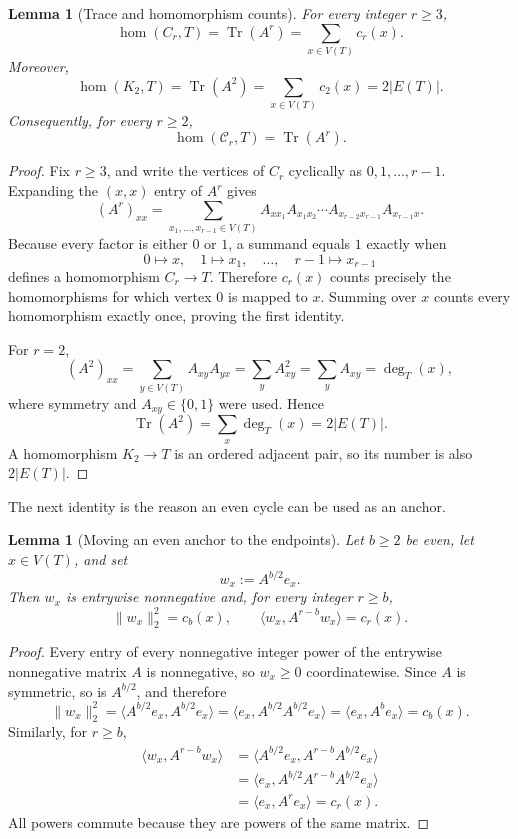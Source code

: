 \documentclass[11pt]{article}
\newtheorem{lemma}[theorem]{Lemma}
\newcommand{\homn}{\operatorname{hom}}
\newcommand{\tr}{\operatorname{Tr}}
\newcommand{\1}{\mathbf{1}}
\newcommand{\Ct}{\mathcal{C}}
\begin{document}
\begin{lemma}[Trace and homomorphism counts]\label{lem:trace-hom}
For every integer $r\ge3$,
\[
  \homn(C_r,T)=\tr(A^r)=\sum_{x\in V(T)}c_r(x).
\]
Moreover,
\[
  \homn(K_2,T)=\tr(A^2)=\sum_{x\in V(T)}c_2(x)=2|E(T)|.
\]
Consequently, for every $r\ge2$,
\[
  \homn(\Ct_r,T)=\tr(A^r).
\]
\end{lemma}

\begin{proof}
Fix $r\ge3$, and write the vertices of $C_r$ cyclically as
$0,1,\ldots,r-1$.  Expanding the $(x,x)$ entry of $A^r$ gives
\[
  (A^r)_{xx}
  =
  \sum_{x_1,\ldots,x_{r-1}\in V(T)}
  A_{x x_1}A_{x_1x_2}\cdots A_{x_{r-2}x_{r-1}}A_{x_{r-1}x}.
\]
Because every factor is either $0$ or $1$, a summand equals $1$ exactly when
\[
  0\mapsto x,
  \quad
  1\mapsto x_1,
  \quad\ldots,\quad
  r-1\mapsto x_{r-1}
\]
defines a homomorphism $C_r\to T$.  Therefore $c_r(x)$ counts precisely the
homomorphisms for which vertex $0$ is mapped to $x$.  Summing over $x$ counts
every homomorphism exactly once, proving the first identity.

For $r=2$,
\[
  (A^2)_{xx}=\sum_{y\in V(T)}A_{xy}A_{yx}
  =\sum_y A_{xy}^2
  =\sum_y A_{xy}
  =\deg_T(x),
\]
where symmetry and $A_{xy}\in\{0,1\}$ were used.  Hence
\[
  \tr(A^2)=\sum_x\deg_T(x)=2|E(T)|.
\]
A homomorphism $K_2\to T$ is an ordered adjacent pair, so its number is also
$2|E(T)|$.
\end{proof}

The next identity is the reason an even cycle can be used as an anchor.

\begin{lemma}[Moving an even anchor to the endpoints]\label{lem:anchor-vector}
Let $b\ge2$ be even, let $x\in V(T)$, and set
\[
  w_x:=A^{b/2}e_x.
\]
Then $w_x$ is entrywise nonnegative and, for every integer $r\ge b$,
\[
  \|w_x\|_2^2=c_b(x),
  \qquad
  \langle w_x,A^{r-b}w_x\rangle=c_r(x).
\]
\end{lemma}

\begin{proof}
Every entry of every nonnegative integer power of the entrywise nonnegative
matrix $A$ is nonnegative, so $w_x\ge0$ coordinatewise.  Since $A$ is
symmetric, so is $A^{b/2}$, and therefore
\[
  \|w_x\|_2^2
  =\langle A^{b/2}e_x,A^{b/2}e_x\rangle
  =\langle e_x,A^{b/2}A^{b/2}e_x\rangle
  =\langle e_x,A^b e_x\rangle
  =c_b(x).
\]
Similarly, for $r\ge b$,
\[
\begin{aligned}
  \langle w_x,A^{r-b}w_x\rangle
  &=\langle A^{b/2}e_x,A^{r-b}A^{b/2}e_x\rangle\\
  &=\langle e_x,A^{b/2}A^{r-b}A^{b/2}e_x\rangle\\
  &=\langle e_x,A^r e_x\rangle
  =c_r(x).
\end{aligned}
\]
All powers commute because they are powers of the same matrix.
\end{proof}
\end{document}

